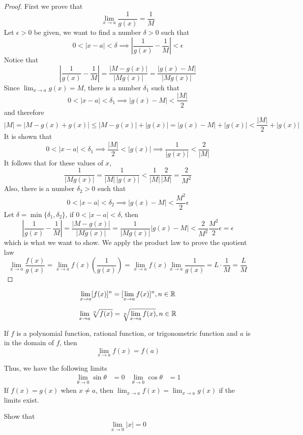 \begin{proof}
    First we prove that \[\lim_{x\to a}\frac{1}{g(x)}=\frac{1}{M}\]
    Let \(\epsilon>0\) be given, we want to find a number \(\delta>0\) such that
    \[0<|x-a|<\delta\implies\left|\frac{1}{g(x)}-\frac{1}{M}\right|<\epsilon\]
    Notice that \[\left|\frac{1}{g(x)}-\frac{1}{M}\right|=\frac{|M-g(x)|}{|Mg(x)|}
    =\frac{|g(x)-M|}{|Mg(x)|}\]
    Since \(\lim_{x\to a}g(x)=M\), there is a number \(\delta_1\) such that
    \[0<|x-a|<\delta_1\implies|g(x)-M|<\frac{|M|}{2}\] and therefore
    \[|M|=|M-g(x)+g(x)|\leq|M-g(x)|+|g(x)|=|g(x)-M|+|g(x)|<\frac{|M|}{2}+|g(x)|\]
    It is shown that
    \[0<|x-a|<\delta_1\implies\frac{|M|}{2}<|g(x)|\implies\frac{1}{|g(x)|}
    <\frac{2}{|M|}\]
    It follows that for these values of \(x\),
    \[\frac{1}{|Mg(x)|}=\frac{1}{|M|\,|g(x)|}<\frac{1}{|M|}\frac{2}{|M|}
    =\frac{2}{M^2}\]
    Also, there is a number \(\delta_2>0\) such that
    \[0<|x-a|<\delta_2\implies|g(x)-M|<\frac{M^2}{2}\epsilon\]
    Let \(\delta=\min\{\delta_1,\delta_2\}\), if \(0<|x-a|<\delta\), then
    \[\left|\frac{1}{g(x)}-\frac{1}{M}\right|=\frac{|M-g(x)|}{|Mg(x)|}
    =\frac{1}{|Mg(x)|}|g(x)-M|<\frac{2}{M^2}\frac{M^2}{2}\epsilon=\epsilon\]
    which is what we want to show.
    We apply the product law to prove the quotient law
    \[\lim_{x\to a}\frac{f(x)}{g(x)}=\lim_{x\to a}f(x)\left(\frac{1}{g(x)}\right)
    =\lim_{x\to a}f(x)\lim_{x\to a}\frac{1}{g(x)}=L\cdot\frac{1}{M}=\frac{L}{M}\]
\end{proof}
\begin{theorem}
    \[\lim_{x\to a}[f(x)]^n=[\lim_{x\to a}f(x)]^n,n\in\mathbb{R}\]
\end{theorem}
\begin{theorem}
    \[\lim_{x\to a}\sqrt[n]{f(x)}=\sqrt[n]{\lim_{x\to a}f(x)},n\in\mathbb{R}\]
\end{theorem}
\begin{theorem}
    If \(f\) is a polynomial function, rational function, or trigonometric
    function and \(a\) is in the domain of \(f\), then
    \[\lim_{x\to a}f(x)=f(a)\]
\end{theorem}
Thus, we have the following limits
\begin{align*}
    \lim_{\theta\to 0}\sin\theta&=0 & \lim_{\theta\to 0}\cos\theta&=1
\end{align*}
If \(f(x)=g(x)\) when \(x\neq a\), then \(\lim_{x\to a}f(x)=\lim_{x\to a}g(x)\)
if the limits exist.
\begin{problem}
    Show that \[\lim_{x\to 0}|x|=0\]
\end{problem}
